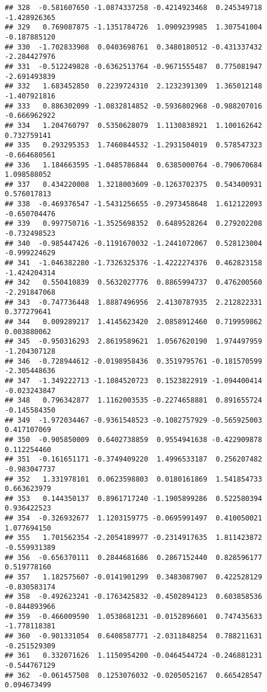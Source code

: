 \documentclass[
]{article}
\begin{document}
\begin{verbatim}
## 328  -0.581607650 -1.0874337258 -0.4214923468  0.245349718 -1.428926365
## 329   0.769087875 -1.1351784726  1.0909239985  1.307541004 -0.187885120
## 330  -1.702833908  0.0403698761  0.3480180512 -0.431337432 -2.284427976
## 331  -0.512249828 -0.6362513764 -0.9671555487  0.775081947 -2.691493839
## 332   1.683452850  0.2239724310  2.1232391309  1.365012148 -1.407921816
## 333   0.886302099 -1.0832814852 -0.5936802968 -0.988207016 -0.666962922
## 334   1.204760797  0.5350628079  1.1130838921  1.100162642  0.732759141
## 335   0.293295353  1.7460844532 -1.2931504019  0.578547323 -0.664680561
## 336   1.184663595 -1.0485786844  0.6385000764 -0.790670684  1.098588052
## 337   0.434220008  1.3218003609 -0.1263702375  0.543400931  0.576017813
## 338  -0.469376547 -1.5431256655 -0.2973458648  1.612122093 -0.650704476
## 339   0.997750716 -1.3525698352  0.6489528264  0.279202208 -0.732498523
## 340  -0.985447426 -0.1191670032 -1.2441072067  0.528123004 -0.999224629
## 341  -1.046382280 -1.7326325376 -1.4222274376  0.462823158 -1.424204314
## 342   0.550410839  0.5632027776  0.8865994737  0.476200560 -2.291847068
## 343  -0.747736448  1.8887496956  2.4130787935  2.212822331  0.377279641
## 344   0.009289217  1.4145623420  2.0858912460  0.719959862  0.003880062
## 345  -0.950316293  2.8619589621  1.0567620190  1.974497959 -1.204307128
## 346  -0.728944612 -0.0198958436  0.3519795761 -0.181570599 -2.305448636
## 347  -1.349222713 -1.1084520723  0.1523822919 -1.094400414 -0.023243847
## 348   0.796342877  1.1162003535 -0.2274658881  0.891655724 -0.145584350
## 349  -1.972034467 -0.9361548523 -0.1082757929 -0.565925003  0.417107069
## 350  -0.905850009  0.6402738859  0.9554941638 -0.422909878  0.112254460
## 351  -0.161651171 -0.3749409220  1.4996533187  0.256207482 -0.983047737
## 352   1.331978101  0.0623598803  0.0180161869  1.541854733  0.663623979
## 353   0.144350137  0.8961717240 -1.1905899286  0.522580394  0.936422523
## 354  -0.326932677  1.1203159775 -0.0695991497  0.410050021  1.077694150
## 355   1.701562354 -2.2054189977 -0.2314917635  1.811423872 -0.559931389
## 356  -0.656370111  0.2844681686  0.2867152440  0.828596177  0.519778160
## 357   1.182575607 -0.0141901299  0.3483087907  0.422528129 -0.830583174
## 358  -0.492623241 -0.1763425832 -0.4502894123  0.603858536 -0.844893966
## 359  -0.466009590  1.0538681231 -0.0152896601  0.747435633 -1.778118381
## 360  -0.901331054  0.6408587771 -2.0311848254  0.788211631 -0.251529309
## 361   0.332071626  1.1150954200 -0.0464544724 -0.246881231 -0.544767129
## 362  -0.061457508  0.1253076032 -0.0205052167  0.665428547  0.094673499

\end{verbatim}
\end{document}
